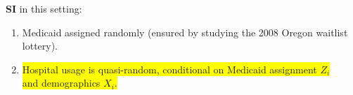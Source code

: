 \documentclass[dvipsnames,handout]{beamer} %
\renewcommand{\vec}[1]{\boldsymbol{\mathit{#1}}}                           %
\begin{document}
\begin{frame}[noframenumbering]
\begin{figure}[h!]
\begin{subfigure}[c]{0.55\textwidth}
        \end{subfigure}
    \end{figure}
    \textbf{SI} in this setting:
    \begin{enumerate}
        \item Medicaid assigned randomly (ensured by studying the 2008 Oregon waitlist lottery).
        \item \colorbox{yellow}{Hospital usage is quasi-random, conditional on Medicaid assignment $Z_i$} \\
        \colorbox{yellow}{and demographics $\vec X_i$.}

    \end{enumerate}
\end{frame}
\end{document}
